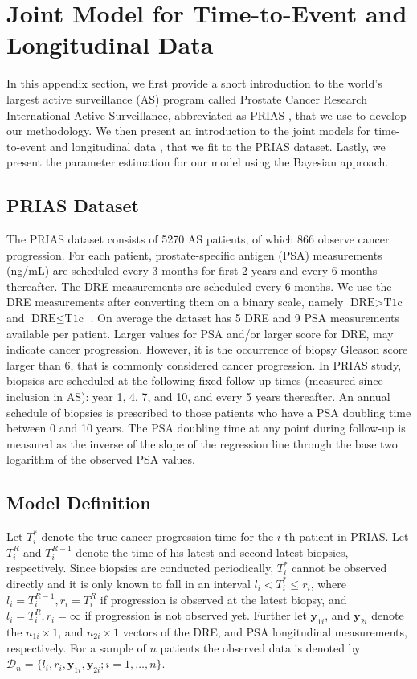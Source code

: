 \section{Joint Model for Time-to-Event and Longitudinal Data}
\label{sec:jm_framework}
In this appendix section, we first provide a short introduction to the world's largest active surveillance (AS) program called Prostate Cancer Research International Active Surveillance, abbreviated as PRIAS \citep{bul2013active}, that we use to develop our methodology. We then present an introduction to the joint models for time-to-event and longitudinal data \citep{tsiatis2004joint,rizopoulos2012joint}, that we fit to the PRIAS dataset.  Lastly, we present the parameter estimation for our model using the Bayesian approach. 

\subsection{PRIAS Dataset}
The PRIAS dataset consists of 5270 AS patients, of which 866 observe cancer progression. For each patient, prostate-specific antigen (PSA) measurements (ng/mL) are scheduled every 3 months for first 2 years and every 6 months thereafter. The DRE measurements are scheduled every 6 months. We use the DRE measurements after converting them on a binary scale, namely $\mbox{DRE} > \mbox{T1c}$ and $\mbox{DRE} \leq \mbox{T1c}$ \cite{schroder1992tnm}. On average the dataset has 5 DRE and 9 PSA measurements available per patient. Larger values for PSA and/or larger score for DRE, may indicate cancer progression. However, it is the occurrence of biopsy Gleason score larger than 6, that is commonly considered cancer progression. In PRIAS study, biopsies are scheduled at the  following fixed follow-up times (measured since inclusion in AS): year 1, 4, 7, and 10, and every 5 years thereafter. An annual schedule of biopsies is prescribed to those patients who have a PSA doubling time between 0 and 10 years. The PSA doubling time at any point during follow-up is measured as the inverse of the slope of the regression line through the base two logarithm of the observed PSA values.

\subsection{Model Definition}
\label{subsec:model_def}
Let $T_i^*$ denote the true cancer progression time for the $i$-th patient in PRIAS. Let $T_i^R$ and $T_i^{R-1}$ denote the time of his latest and second latest biopsies, respectively. Since biopsies are conducted periodically, $T_i^*$ cannot be observed directly and it is only known to fall in an interval ${l_i < T_i^* \leq r_i}$, where ${l_i = T_i^{R-1}, r_i = T_i^R}$ if progression is observed at the latest biopsy, and ${l_i = T_i^R, r_i=\infty}$ if progression is not observed yet. Further let $\boldsymbol{y}_{1i}$, and $\boldsymbol{y}_{2i}$ denote the $n_{1i} \times 1$, and $n_{2i} \times 1$ vectors of the DRE, and PSA longitudinal measurements, respectively. For a sample of $n$ patients the observed data is denoted by ${\mathcal{D}_n = \{l_i, r_i, \boldsymbol{y}_{1i}, \boldsymbol{y}_{2i}; i = 1, \ldots, n\}}$.

